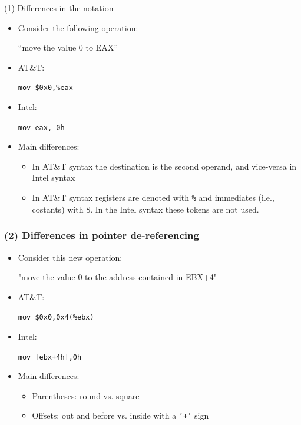 \documentclass[]{beamer}
\begin{document}
\begin{frame}{(1) Differences in the notation}
  \begin{itemize}
  \item{Consider the following operation:\newline
      \centerline{``move the value 0 to EAX''}}
  \item{AT\&T: \centerline{\texttt{mov \$0x0,\%eax}} }
  \item{Intel: \centerline{\texttt{mov eax, 0h}}}
    \item{Main differences:}
      \begin{itemize}
      \item{In AT\&T syntax the destination is the second operand, and vice-versa in Intel syntax}
      \item{In AT\&T syntax registers are denoted with \texttt{\%} and immediates (i.e., costants) with \$. In the Intel syntax these tokens are not used. }
      \end{itemize}
    \end{itemize}
  \end{frame}

\begin{frame}
  \frametitle{(2) Differences in pointer de-referencing}
  \begin{itemize}
  \item{Consider this new operation:\newline\centerline {"move the value 0 to the address contained in EBX+4"}}
  \item{AT\&T: \centerline{ \texttt{mov \$0x0,0x4(\%ebx)}}}
  \item{Intel: \centerline{ \texttt{mov [ebx+4h],0h} }}
  \item{Main differences:}
    \begin{itemize}
    \item{Parentheses: round vs. square}
    \item{Offsets: out and before vs. inside with a \texttt{`+'} sign}
    \end{itemize}
  \end{itemize}
\end{frame}
\end{document}
